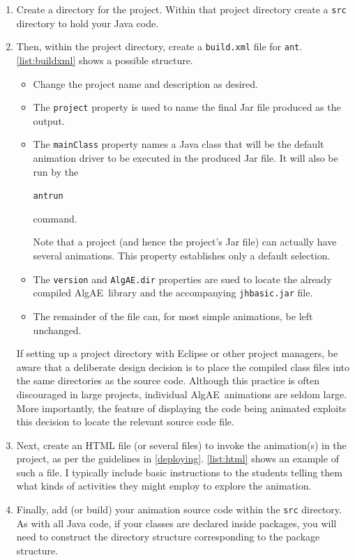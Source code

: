 \documentclass[11pt,titlepage]{book}
\newcommand{\algae}{{\sc AlgAE}}
\begin{document}
\begin{enumerate}
\item Create a directory for the project. Within that project directory 
create a \texttt{src} directory to hold your Java code.

\item Then, within the project directory, create a \texttt{build.xml} file for \texttt{ant}. \autoref{list:buildxml} shows a possible structure.

\begin{itemize}
  \item Change the project name and description as desired.
  \item The \texttt{project} property is used to name the final Jar file
    produced as the output.
  \item The \texttt{mainClass} property names a Java class that will be
    the default animation driver to be executed in the produced Jar file.
    It will also be run by the
\begin{alltt}
ant run
\end{alltt}
    command.
    
    Note that a project (and hence the project's Jar file) can actually have
    several animations. This property establishes only a default selection.

  \item The \texttt{version} and \texttt{AlgAE.dir} properties are sued 
    to locate the already compiled \algae\ library and the accompanying
    \texttt{jhbasic.jar} file.

  \item The remainder of the file can, for most simple animations, be left
    unchanged.
\end{itemize}

If setting up a project directory with Eclipse \cite{Eclipse} or other
project managers, be aware that a deliberate design decision is to
place the compiled class files into the same directories as the source
code. Although this practice is often discouraged in large projects,
individual \algae\ animations are seldom large. More importantly, the
feature of displaying the code being animated exploits this decision
to locate the relevant source code file.

\item Next, create an HTML file (or several files) to invoke the
  animation(s) in the project, as per the guidelines in
  \autoref{deploying}. \autoref{list:html} shows an example of such a
  file. I typically include basic instructions to the students telling
  them what kinds of activities they might employ to explore the
  animation.
  

\item Finally, add (or build) your animation source code within the
  \texttt{src} directory. As with all Java code, if your classes are
  declared inside packages, you will need to construct the directory
  structure corresponding to the package structure.
\end{enumerate}
\end{document}
